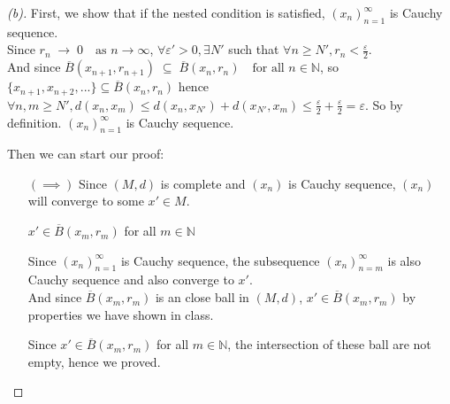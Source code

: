 \begin{proof}[(b)]
    First, we show that if the nested condition is satisfied, $(x_n)_{n=1}^\infty$ is Cauchy sequence. \\
    Since $r_n \;\to\; 0 \quad\text{as } n\to\infty$, $\forall \varepsilon' > 0, \exists N'$ such that $\forall n \geq N', r_n < \frac{\varepsilon}{2}$. \\
    And since $\overline{B}(x_{n+1},r_{n+1}) \;\subseteq\; \overline{B}(x_n,r_n) \quad\text{for all } n\in\mathbb{N}$, so $\{x_{n+1},x_{n+2}, ...\} \subseteq \overline{B}(x_n,r_n)$ hence $\forall n, m \geq N', d(x_n, x_m) \leq d(x_n, x_{N'}) + d(x_{N'}, x_m) \leq \frac{\varepsilon}{2} + \frac{\varepsilon}{2} = \varepsilon$.
    So by definition. $(x_n)_{n=1}^\infty$ is Cauchy sequence.

    Then we can start our proof:
    \begin{itemize}
        \item [\((\implies )\)] Since $(M,d)$ is complete and $(x_n)$ is Cauchy sequence, $(x_n)$ will converge to some $x' \in M$. \\
        \begin{claim}
            $x' \in \overline{B}(x_m,r_m)$ for all $m \in \mathbb{N}$
        \end{claim}
        \begin{explanation}
            Since $(x_n)_{n=1}^\infty$ is Cauchy sequence, the subsequence $(x_n)_{n=m}^\infty$ is also Cauchy sequence and also converge to $x'$. \\
            And since $\overline{B}(x_m,r_m)$ is an close ball in $(M, d)$, $x' \in \overline{B}(x_m,r_m)$ by properties we have shown in class.
        \end{explanation}
        Since $x' \in \overline{B}(x_m,r_m)$ for all $m \in \mathbb{N}$, the intersection of these ball are not empty, hence we proved.


\end{itemize}
\end{proof}
